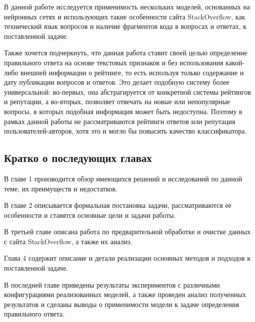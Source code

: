 \documentclass[../diploma.tex]{subfiles}
\begin{document}
    В данной работе исследуется применимость нескольких моделей, основанных на нейронных сетях и использующих такие особенности сайта StackOverflow, 
    как технический язык вопросов и наличие фрагментов кода в вопросах и ответах, к поставленной задаче.

	Также хочется подчеркнуть, что данная работа ставит своей целью определение правильного ответа на основе текстовых признаков и 
	без использования какой-либо внешней информации о рейтинге, то есть используя только содержание и дату публикации вопросов и ответов.
	Это делает подобную систему более универсальной: во-первых, она абстрагируется от конкретной системы рейтингов и репутации, 
	а во-вторых, позволяет отвечать на новые или непопулярные вопросы, в которых подобная информация может быть недоступна.
	Поэтому в рамках данной работы не рассматриваются рейтинги ответов или репутация пользователей-авторов, хотя это и могло бы повысить качество классификатора.

    \subsection*{Кратко о последующих главах}

	В главе 1 производится обзор имеющихся решений и исследований по данной теме, их преимуществ и недостатков.

	В главе 2 описывается формальная постановка задачи, рассматриваются ее особенности и ставятся основные цели и задачи работы.

	В третьей главе описана работа по предварительной обработке и очистке данных с сайта StackOverflow, а также их анализ.

	Глава 4 содержит описание и детали реализации основных методов и подходов к поставленной задаче.

	В последней главе приведены результаты экспериментов с различными конфигурациями реализованных моделей, 
	а также проведен анализ полученных результатов и сделаны выводы о применимости модели к задаче определения правильного ответа.
\end{document}
